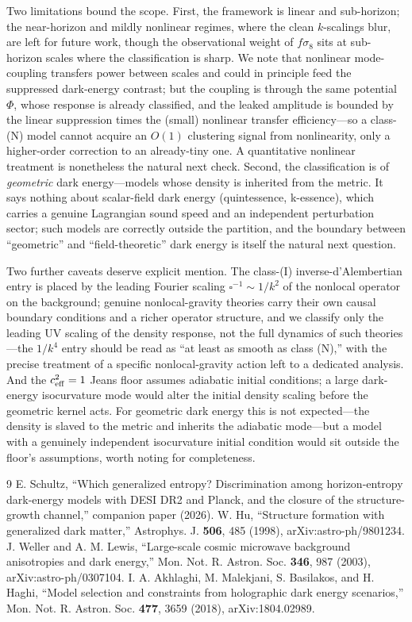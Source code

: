 \documentclass[twocolumn,10pt]{article}
\begin{document}
Two limitations bound the scope. First, the framework is linear and
sub-horizon; the near-horizon and mildly nonlinear regimes, where the clean
$k$-scalings blur, are left for future work, though the observational weight of
$f\sigma_8$ sits at sub-horizon scales where the classification is sharp. We
note that nonlinear mode-coupling transfers power between scales and could in
principle feed the suppressed dark-energy contrast; but the coupling is through
the same potential $\Phi$, whose response is already classified, and the leaked
amplitude is bounded by the linear suppression times the (small) nonlinear
transfer efficiency---so a class-(N) model cannot acquire an $O(1)$ clustering
signal from nonlinearity, only a higher-order correction to an already-tiny
one. A quantitative nonlinear treatment is nonetheless the natural next check.
Second, the classification is of \emph{geometric} dark energy---models whose
density is inherited from the metric. It says nothing about scalar-field dark
energy (quintessence, k-essence), which carries a genuine Lagrangian sound speed
and an independent perturbation sector; such models are correctly outside the
partition, and the boundary between ``geometric'' and ``field-theoretic'' dark
energy is itself the natural next question.

Two further caveats deserve explicit mention. The class-(I) inverse-d'Alembertian
entry is placed by the leading Fourier scaling $\square^{-1}\sim1/k^2$ of the
nonlocal operator on the background; genuine nonlocal-gravity theories carry
their own causal boundary conditions and a richer operator structure, and we
classify only the leading UV scaling of the density response, not the full
dynamics of such theories---the $1/k^4$ entry should be read as ``at least as
smooth as class (N),'' with the precise treatment of a specific nonlocal-gravity
action left to a dedicated analysis. And the $c_{\rm eff}^2=1$ Jeans floor
assumes adiabatic initial conditions; a large dark-energy isocurvature mode
would alter the initial density scaling before the geometric kernel acts. For
geometric dark energy this is not expected---the density is slaved to the metric
and inherits the adiabatic mode---but a model with a genuinely independent
isocurvature initial condition would sit outside the floor's assumptions, worth
noting for completeness.

\begin{thebibliography}{9}
 E. Schultz, ``Which generalized entropy? Discrimination
among horizon-entropy dark-energy models with DESI DR2 and Planck, and the
closure of the structure-growth channel,'' companion paper (2026).
 W. Hu, ``Structure formation with generalized dark matter,''
Astrophys. J. \textbf{506}, 485 (1998), arXiv:astro-ph/9801234.
 J. Weller and A. M. Lewis, ``Large-scale cosmic
microwave background anisotropies and dark energy,'' Mon. Not. R. Astron.
Soc. \textbf{346}, 987 (2003), arXiv:astro-ph/0307104.
 I. A. Akhlaghi, M. Malekjani, S. Basilakos, and H. Haghi,
``Model selection and constraints from holographic dark energy scenarios,''
Mon. Not. R. Astron. Soc. \textbf{477}, 3659 (2018), arXiv:1804.02989.
\end{thebibliography}
\end{document}
